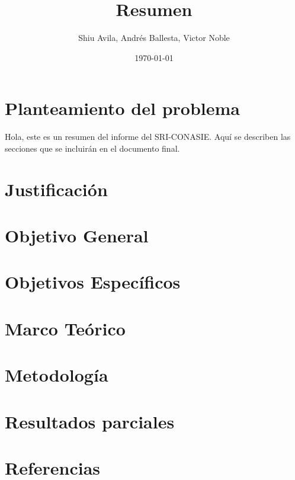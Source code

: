 \documentclass[12pt,a4paper]{article}
\title{Resumen}
\author{Shiu Avila, Andrés Ballesta, Victor Noble}
\date{\today}
\begin{document}
\maketitle

\section{Planteamiento del problema}

Hola, este es un resumen del informe del SRI-CONASIE. Aquí se describen las secciones que se incluirán en el documento final.

\section{Justificación}
\section{Objetivo General}
\section{Objetivos Específicos}
\section{Marco Teórico}
\section{Metodología}
\section{Resultados parciales}
\section{Referencias}
\end{document}
